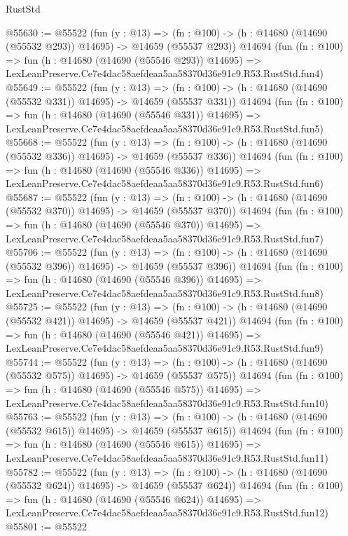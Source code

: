 \begin{lexlean}{RustStd}
\begin{coremodule}
@55630 := @55522
    (fun (y : @13) =>
    (fn : @100) -> (h : @14680 (@14690 (@55532 @293)) @14695) -> @14659 (@55537 @293))
    @14694
    (fun (fn : @100) =>
    fun (h : @14680 (@14690 (@55546 @293)) @14695) =>
    LexLeanPreserve.Ce7e4dac58aefdeaa5aa58370d36e91c9.R53.RustStd.fun4)
@55649 := @55522
    (fun (y : @13) =>
    (fn : @100) -> (h : @14680 (@14690 (@55532 @331)) @14695) -> @14659 (@55537 @331))
    @14694
    (fun (fn : @100) =>
    fun (h : @14680 (@14690 (@55546 @331)) @14695) =>
    LexLeanPreserve.Ce7e4dac58aefdeaa5aa58370d36e91c9.R53.RustStd.fun5)
@55668 := @55522
    (fun (y : @13) =>
    (fn : @100) -> (h : @14680 (@14690 (@55532 @336)) @14695) -> @14659 (@55537 @336))
    @14694
    (fun (fn : @100) =>
    fun (h : @14680 (@14690 (@55546 @336)) @14695) =>
    LexLeanPreserve.Ce7e4dac58aefdeaa5aa58370d36e91c9.R53.RustStd.fun6)
@55687 := @55522
    (fun (y : @13) =>
    (fn : @100) -> (h : @14680 (@14690 (@55532 @370)) @14695) -> @14659 (@55537 @370))
    @14694
    (fun (fn : @100) =>
    fun (h : @14680 (@14690 (@55546 @370)) @14695) =>
    LexLeanPreserve.Ce7e4dac58aefdeaa5aa58370d36e91c9.R53.RustStd.fun7)
@55706 := @55522
    (fun (y : @13) =>
    (fn : @100) -> (h : @14680 (@14690 (@55532 @396)) @14695) -> @14659 (@55537 @396))
    @14694
    (fun (fn : @100) =>
    fun (h : @14680 (@14690 (@55546 @396)) @14695) =>
    LexLeanPreserve.Ce7e4dac58aefdeaa5aa58370d36e91c9.R53.RustStd.fun8)
@55725 := @55522
    (fun (y : @13) =>
    (fn : @100) -> (h : @14680 (@14690 (@55532 @421)) @14695) -> @14659 (@55537 @421))
    @14694
    (fun (fn : @100) =>
    fun (h : @14680 (@14690 (@55546 @421)) @14695) =>
    LexLeanPreserve.Ce7e4dac58aefdeaa5aa58370d36e91c9.R53.RustStd.fun9)
@55744 := @55522
    (fun (y : @13) =>
    (fn : @100) -> (h : @14680 (@14690 (@55532 @575)) @14695) -> @14659 (@55537 @575))
    @14694
    (fun (fn : @100) =>
    fun (h : @14680 (@14690 (@55546 @575)) @14695) =>
    LexLeanPreserve.Ce7e4dac58aefdeaa5aa58370d36e91c9.R53.RustStd.fun10)
@55763 := @55522
    (fun (y : @13) =>
    (fn : @100) -> (h : @14680 (@14690 (@55532 @615)) @14695) -> @14659 (@55537 @615))
    @14694
    (fun (fn : @100) =>
    fun (h : @14680 (@14690 (@55546 @615)) @14695) =>
    LexLeanPreserve.Ce7e4dac58aefdeaa5aa58370d36e91c9.R53.RustStd.fun11)
@55782 := @55522
    (fun (y : @13) =>
    (fn : @100) -> (h : @14680 (@14690 (@55532 @624)) @14695) -> @14659 (@55537 @624))
    @14694
    (fun (fn : @100) =>
    fun (h : @14680 (@14690 (@55546 @624)) @14695) =>
    LexLeanPreserve.Ce7e4dac58aefdeaa5aa58370d36e91c9.R53.RustStd.fun12)
@55801 := @55522

\end{coremodule}
\end{lexlean}
